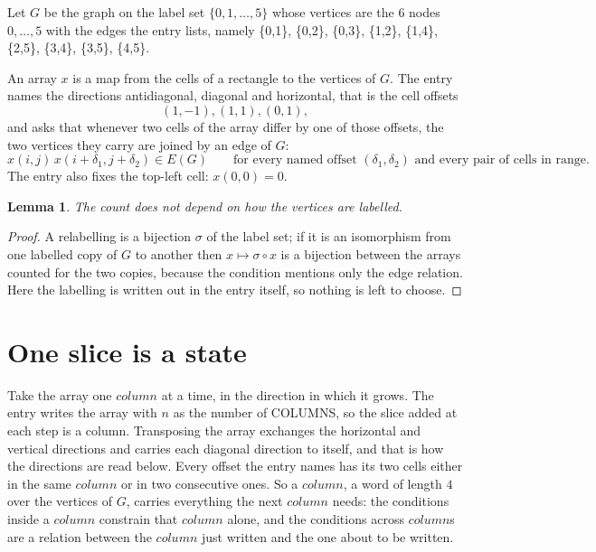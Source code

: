 \documentclass[11pt,a4paper]{article}
\theoremstyle{plain}
\newtheorem{lemma}[theorem]{Lemma}
\theoremstyle{definition}
\begin{document}
Let $G$ be the graph on the label set $\{0,1,\dots,5\}$ whose vertices are the $6$ nodes $0,\dots,5$ with the edges the entry lists, namely \{0,1\}, \{0,2\}, \{0,3\}, \{1,2\}, \{1,4\}, \{2,5\}, \{3,4\}, \{3,5\}, \{4,5\}.

An array $x$ is a map from the cells of a rectangle to the vertices of $G$. The entry names the
directions antidiagonal, diagonal and horizontal, that is the cell offsets
\[
(1,-1), (1,1), (0,1),
\]
and asks that whenever two cells of the array differ by one of those offsets, the two vertices
they carry are joined by an edge of $G$:
\[
x(i,j)\,x(i+\delta_1,j+\delta_2)\in E(G)\qquad
\text{for every named offset } (\delta_1,\delta_2)\text{ and every pair of cells in range.}
\]
The entry also fixes the top-left cell: $x(0,0)=0$.

\begin{lemma}\label{lem:label}
The count does not depend on how the vertices are labelled.
\end{lemma}

\begin{proof}
A relabelling is a bijection $\sigma$ of the label set; if it is an isomorphism from one
labelled copy of $G$ to another then $x\mapsto\sigma\circ x$ is a bijection between the arrays
counted for the two copies, because the condition mentions only the edge relation.
Here the labelling is written out in the entry itself, so nothing is left to choose.
\end{proof}

\section{One slice is a state}

Take the array one $column$ at a time, in the direction in which it grows. The entry writes the array with $n$ as the number of COLUMNS, so the slice added at each step is a column. Transposing the array exchanges the horizontal and vertical directions and carries each diagonal direction to itself, and that is how the directions are read below.
Every offset the entry names has its two cells either in the same $column$ or in two
consecutive ones. So a $column$, a word of length $4$ over the vertices of $G$, carries
everything the next $column$ needs: the conditions inside a $column$ constrain that
$column$ alone, and the conditions across $column$s are a relation between the
$column$ just written and the one about to be written.
\end{document}
